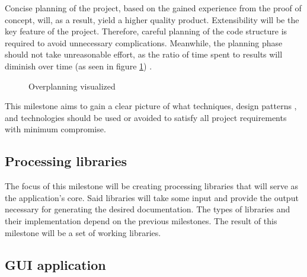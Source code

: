 Concise planning of the project, based on the gained experience from the proof of concept, will, as a result, yield a higher quality product.
Extensibility will be the key feature of the project. Therefore, careful planning of the code structure is required to avoid unnecessary complications.
Meanwhile, the planning phase should not take unreasonable effort, as the ratio of time spent to results will diminish over time (as seen in figure \ref{fig:overplanning}) \cite{ruparelia_stop_2016}.

\begin{figure}[H]
    \centering
    \caption{Overplanning visualized}
    \label{fig:overplanning}
\end{figure}

This milestone aims to gain a clear picture of what techniques, design patterns \cite{humblot_design_2021}, and technologies should be used or avoided to satisfy all project requirements with minimum compromise.

\subsection*{Processing libraries} \label{subSecProcessingLibs}

The focus of this milestone will be creating processing libraries that will serve as the application's core. Said libraries will take some input and provide the output necessary for generating the desired documentation. The types of libraries and their implementation depend on the previous milestones. The result of this milestone will be a set of working libraries.

\subsection*{GUI application} \label{subSecGuiApp}

